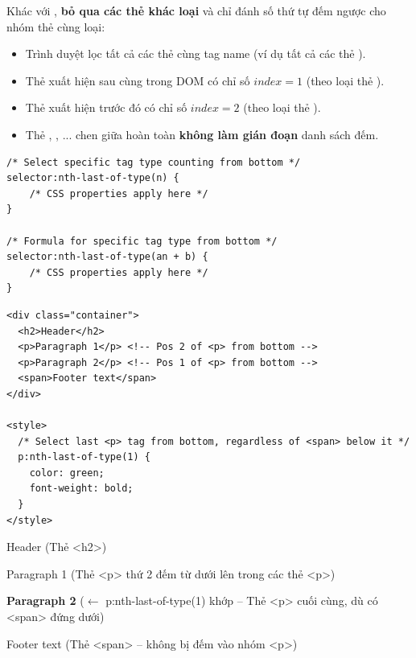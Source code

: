 \begin{conceptBox}
Khác với ,  \textbf{bỏ qua các thẻ khác loại} và chỉ đánh số thứ tự đếm ngược cho nhóm thẻ cùng loại:
\begin{itemize}[leftmargin=1.5em, itemsep=2pt, parsep=0pt]
    \item Trình duyệt lọc tất cả các thẻ cùng tag name (ví dụ tất cả các thẻ ).
    \item Thẻ  xuất hiện sau cùng trong DOM có chỉ số $index = 1$ (theo loại thẻ ).
    \item Thẻ  xuất hiện trước đó có chỉ số $index = 2$ (theo loại thẻ ).
    \item Thẻ , , ... chen giữa hoàn toàn \textbf{không làm gián đoạn} danh sách đếm.
\end{itemize}
\end{conceptBox}

\begin{codeWindow}
\begin{lstlisting}[language=CSS3]
/* Select specific tag type counting from bottom */
selector:nth-last-of-type(n) {
    /* CSS properties apply here */
}

/* Formula for specific tag type from bottom */
selector:nth-last-of-type(an + b) {
    /* CSS properties apply here */
}
\end{lstlisting}
\end{codeWindow}

\begin{codeWindow}
\begin{lstlisting}[language=HTML5]
<div class="container">
  <h2>Header</h2>
  <p>Paragraph 1</p> <!-- Pos 2 of <p> from bottom -->
  <p>Paragraph 2</p> <!-- Pos 1 of <p> from bottom -->
  <span>Footer text</span>
</div>

<style>
  /* Select last <p> tag from bottom, regardless of <span> below it */
  p:nth-last-of-type(1) {
    color: green;
    font-weight: bold;
  }
</style>
\end{lstlisting}
\end{codeWindow}

\begin{browserWindow}
\sffamily\small
Header {\scriptsize\textcolor{gray!60}{(Thẻ <h2>)}} \par\vspace{2pt}
Paragraph 1 {\scriptsize\textcolor{gray!60}{(Thẻ <p> thứ 2 đếm từ dưới lên trong các thẻ <p>)}} \par\vspace{2pt}
\textcolor{green!70!black}{\textbf{Paragraph 2}} {\scriptsize\textcolor{gray!60}{($\leftarrow$ p:nth-last-of-type(1) khớp -- Thẻ <p> cuối cùng, dù có <span> đứng dưới)}} \par\vspace{2pt}
Footer text {\scriptsize\textcolor{gray!60}{(Thẻ <span> -- không bị đếm vào nhóm <p>)}}
\end{browserWindow}

